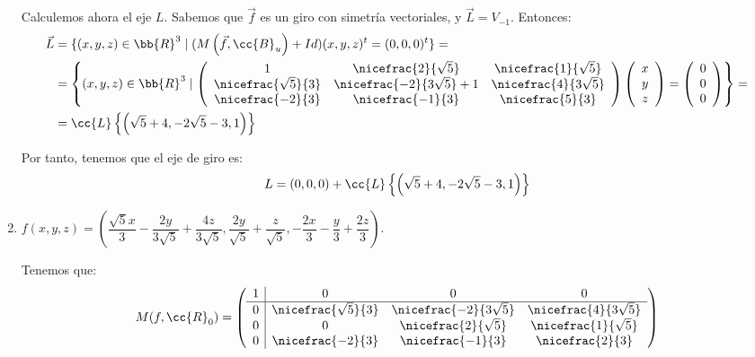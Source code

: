 \begin{ejercicio}
\begin{enumerate}
        Calculemos ahora el eje $L$. Sabemos que $\vec{f}$ es un giro con simetría vectoriales, y $\vec{L}=V_{-1}$. Entonces:
        \begin{equation*}
            \begin{split}
                \vec{L} &= \{ (x,y,z)\in \bb{R}^3 \mid (M\left(\vec{f}, \cc{B}_u\right) + Id) (x,y,z)^t = (0,0, 0)^t \} =\\
                &= \left\{ (x,y,z)\in \bb{R}^3 \mid \left(
                \begin{array}{ccc}
                    1 & \nicefrac{2}{\sqrt{5}} & \nicefrac{1}{\sqrt{5}} \\
                    \nicefrac{\sqrt{5}}{3} & \nicefrac{-2}{3\sqrt{5}}+1 & \nicefrac{4}{3\sqrt{5}} \\
                    \nicefrac{-2}{3} & \nicefrac{-1}{3} & \nicefrac{5}{3}
                \end{array}
                \right)
                \left(
                \begin{array}{c}
                    x\\y\\z
                \end{array}
                \right)
                = \left(
                \begin{array}{c}
                    0\\0\\0
                \end{array}
                \right)
                \right\} =\\
                &= \cc{L}\left\{\left(\sqrt{5}+4, -2\sqrt{5}-3, 1\right)\right\}
            \end{split}
        \end{equation*}

        Por tanto, tenemos que el eje de giro es:
        \begin{equation*}
            L = (0,0,0) + \cc{L}\left\{\left(\sqrt{5}+4, -2\sqrt{5}-3, 1\right)\right\}
        \end{equation*}

        
        \item $f\left(x, y, z\right) = \left(\dfrac{\sqrt{5} x}{3} - \dfrac{2y}{3\sqrt{5}} + \dfrac{4z}{3\sqrt{5}}, \dfrac{2y}{\sqrt{5}} + \dfrac{z}{\sqrt{5}}, -\dfrac{2x}{3}- \dfrac{y}{3} + \dfrac{2z}{3}\right)$.

        Tenemos que:
        \begin{equation*}
            M(f,\cc{R}_0) = \left(\begin{array}{c|ccc}
                1 & 0 & 0 & 0 \\ \hline
                0 & \nicefrac{\sqrt{5}}{3} & \nicefrac{-2}{3\sqrt{5}} & \nicefrac{4}{3\sqrt{5}} \\
                0 & 0 & \nicefrac{2}{\sqrt{5}} & \nicefrac{1}{\sqrt{5}} \\
                0 & \nicefrac{-2}{3} & \nicefrac{-1}{3} & \nicefrac{2}{3} 
            \end{array}\right)
        \end{equation*}


\end{enumerate}
\end{ejercicio}
